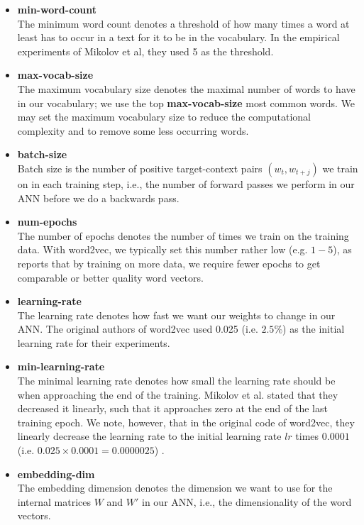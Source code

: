 \begin{itemize}
    \item \textbf{min-word-count} \\
        The minimum word count denotes a threshold of how many times a word at least has to occur in a text for it to be in the vocabulary. In the empirical experiments of Mikolov et al, they used 5 as the threshold.
    \item \textbf{max-vocab-size} \\
        The maximum vocabulary size denotes the maximal number of words to have in our vocabulary; we use the top \textbf{max-vocab-size} most common words. We may set the maximum vocabulary size to reduce the computational complexity and to remove some less occurring words.
    \item \textbf{batch-size} \\
        Batch size is the number of positive target-context pairs $(w_t, w_{t+j})$ we train on in each training step, i.e., the number of forward passes we perform in our ANN before we do a backwards pass.
    \item \textbf{num-epochs} \\
        The number of epochs denotes the number of times we train on the training data. With word2vec, we typically set this number rather low (e.g. $1-5$), as \cites{mikolov2013a} reports that by training on more data, we require fewer epochs to get comparable or better quality word vectors.
    \item \textbf{learning-rate} \\
        The learning rate denotes how fast we want our weights to change in our ANN. The original authors of word2vec used 0.025 (i.e. $2.5\%$) as the initial learning rate for their experiments.
    \item \textbf{min-learning-rate} \\
        The minimal learning rate denotes how small the learning rate should be when approaching the end of the training. Mikolov et al. stated that they decreased it linearly, such that it approaches zero at the end of the last training epoch. We note, however, that in the original code of word2vec, they linearly decrease the learning rate to the initial learning rate $lr$ times $0.0001$ (i.e. $0.025 \times 0.0001 = 0.0000025$) \cite[line 398]{Word2vecCCode}.
    \item \textbf{embedding-dim} \\
        The embedding dimension denotes the dimension we want to use for the internal matrices $W$ and $W'$ in our ANN, i.e., the dimensionality of the word vectors.

\end{itemize}

